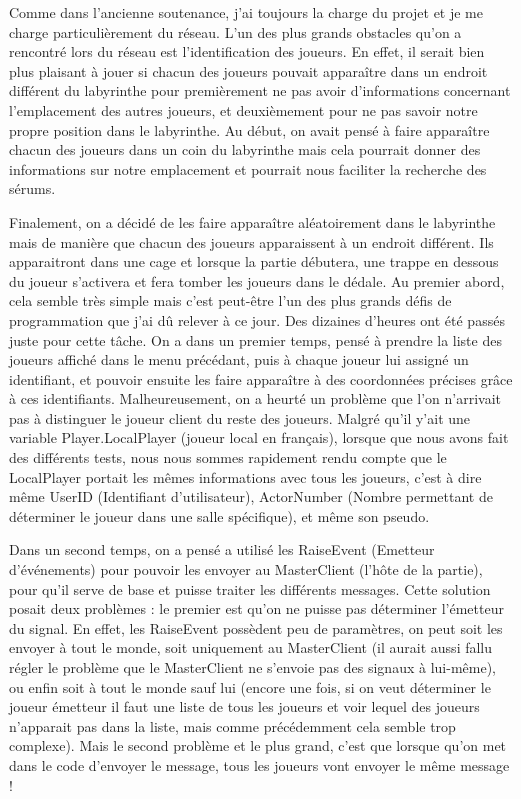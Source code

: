 \documentclass{article}
\begin{document}
Comme dans l'ancienne soutenance, j’ai toujours la charge du projet et je me charge particulièrement du réseau. L'un des plus grands obstacles qu'on a rencontré lors du réseau est l'identification des joueurs. En effet, il serait bien plus plaisant à jouer si chacun des joueurs pouvait apparaître dans un endroit différent du labyrinthe pour premièrement ne pas avoir d'informations concernant l'emplacement des autres joueurs, et deuxièmement pour ne pas savoir notre propre position dans le labyrinthe. Au début, on avait pensé à faire apparaître chacun des joueurs dans un coin du labyrinthe mais cela pourrait donner des informations sur notre emplacement et pourrait nous faciliter la recherche des sérums.

 Finalement, on a décidé de les faire apparaître aléatoirement dans le labyrinthe mais de manière que chacun des joueurs apparaissent à un endroit différent. Ils apparaitront dans une cage et lorsque la partie débutera, une trappe en dessous du joueur s'activera et fera tomber les joueurs dans le dédale. Au premier abord, cela semble très simple mais c'est peut-être l'un des plus grands défis de programmation que j'ai dû relever à ce jour. Des dizaines d'heures ont été passés juste pour cette tâche.
On a dans un premier temps, pensé à prendre la liste des joueurs affiché dans le menu précédant, puis à chaque joueur lui assigné un identifiant, et pouvoir ensuite les faire apparaître à des coordonnées précises grâce à ces identifiants. Malheureusement, on a heurté un problème que l’on n’arrivait pas à distinguer le joueur client du reste des joueurs. Malgré qu'il y'ait une variable Player.LocalPlayer (joueur local en français), lorsque que nous avons fait des différents tests, nous nous sommes rapidement rendu compte que le LocalPlayer portait les mêmes informations avec tous les joueurs, c'est à dire même UserID (Identifiant d'utilisateur), ActorNumber (Nombre permettant de déterminer le joueur dans une salle spécifique), et même son pseudo. 

Dans un second temps, on a pensé a utilisé les RaiseEvent (Emetteur d'événements) pour pouvoir les envoyer au MasterClient (l'hôte de la partie), pour qu'il serve de base et puisse traiter les différents messages. Cette solution posait deux problèmes : le premier est qu'on ne puisse pas déterminer l'émetteur du signal. En effet, les RaiseEvent possèdent peu de paramètres, on peut soit les envoyer à tout le monde, soit uniquement au MasterClient (il aurait aussi fallu régler le problème que le MasterClient ne s'envoie pas des signaux à lui-même), ou enfin soit à tout le monde sauf lui (encore une fois, si on veut déterminer le joueur émetteur il faut une liste de tous les joueurs et voir lequel des joueurs n'apparait pas dans la liste, mais comme précédemment cela semble trop complexe). 
Mais le second problème et le plus grand, c'est que lorsque qu'on met dans le code d'envoyer le message, tous les joueurs vont envoyer le même message !
\end{document}

